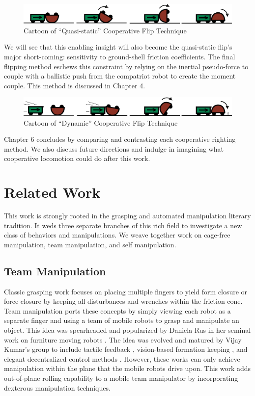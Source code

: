 \documentclass[letterpaper]{report}
\begin{document}
\begin{figure}[ht]
\centering
\includegraphics[width=1.0\textwidth]{QuasiStatic_CoopCartoon.png}
\caption{Cartoon of ``Quasi-static'' Cooperative Flip Technique}
\end{figure}

We will see that this enabling insight will also become the quasi-static flip's major short-coming: sensitivity to ground-shell friction coefficients.
The final flipping method eschews this constraint by relying on the inertial pseudo-force to couple with a ballistic push from the compatriot robot to create the moment couple.
This method is discussed in Chapter 4.

\begin{figure}[ht]
\centering
\includegraphics[width=1.0\textwidth]{Dynamic_CoopCartoon.png}
\caption{Cartoon of ``Dynamic'' Cooperative Flip Technique}
\end{figure}

Chapter 6 concludes by comparing and contrasting each cooperative righting method.
We also discuss future directions and indulge in imagining what cooperative locomotion could do after this work.

\section{Related Work}

This work is strongly rooted in the grasping and automated manipulation literary tradition.
It weds three separate branches of this rich field to investigate a new class of behaviors and manipulations.
We weave together work on cage-free manipulation, team manipulation, and self manipulation.

\subsection{Team Manipulation}
Classic grasping work focuses on placing multiple fingers to yield form closure or force closure by keeping all disturbances and wrenches within the friction cone.
Team manipulation ports these concepts by simply viewing each robot as a separate finger and using a team of mobile robots to grasp and manipulate an object.
This idea was spearheaded and popularized by Daniela Rus in her seminal work on furniture moving robots \cite{rus1995moving}.
The idea was evolved and matured by Vijay Kumar's group to include tactile feedback \cite{sugar2002control}, vision-based formation keeping \cite{spletzer2001cooperative}, and elegant decentralized control methods \cite{song2002potential}.
However, these works can only achieve manipulation within the plane that the mobile robots drive upon.
This work adds out-of-plane rolling capability to a mobile team manipulator by incorporating dexterous manipulation techniques.
\end{document}
